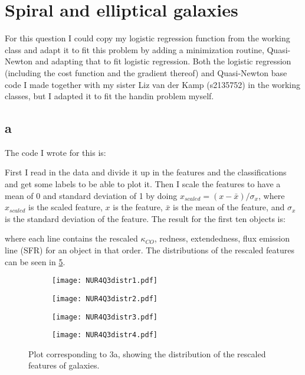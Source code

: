 \section{Spiral and elliptical galaxies}

For this question I could copy my logistic regression function from the working class and adapt it to fit this problem by adding a minimization routine, Quasi-Newton and adapting that to fit logistic regression. 
Both the logistic regression (including the cost function and the gradient thereof) and Quasi-Newton base code I made together with my sister Liz van der Kamp (s2135752) in the working classes, but I adapted it to fit the handin problem myself. 

\subsection*{a}

The code I wrote for this is:


First I read in the data and divide it up in the features and the classifications and get some labels to be able to plot it. Then I scale the features to have a mean of 0 and standard deviation of 1 by doing $x_{scaled} = (x - \bar{x})/\sigma_x$, where $x_{scaled}$ is the scaled feature, $x$ is the feature, $\bar{x}$ is the mean of the feature, and $\sigma_x$ is the standard deviation of the feature. 
The result for the first ten objects is:

where each line contains the rescaled $\kappa_{CO}$, redness, extendedness, flux emission line (SFR) for an object in that order. 
The distributions of the rescaled features can be seen in \ref{fig:fig1}.

\begin{figure}[ht]
    \begin{subfigure}{.49\textwidth}
       \centering
    \texttt{[image: NUR4Q3distr1.pdf]}
    \centering
    \label{}
    \end{subfigure}
    \hfill
    \begin{subfigure}{.49\textwidth}
       \centering
    \texttt{[image: NUR4Q3distr2.pdf]}
    \centering
    \label{}
    \end{subfigure}
     \begin{subfigure}{.49\textwidth}
       \centering
    \texttt{[image: NUR4Q3distr3.pdf]}
    \centering
    \label{}
    \end{subfigure}
     \begin{subfigure}{.49\textwidth}
       \centering
    \texttt{[image: NUR4Q3distr4.pdf]}
    \centering
    \label{}
    \end{subfigure}
    \caption{Plot corresponding to 3a, showing the distribution of the rescaled features of galaxies.}
    \label{fig:fig1}
\end{figure}

